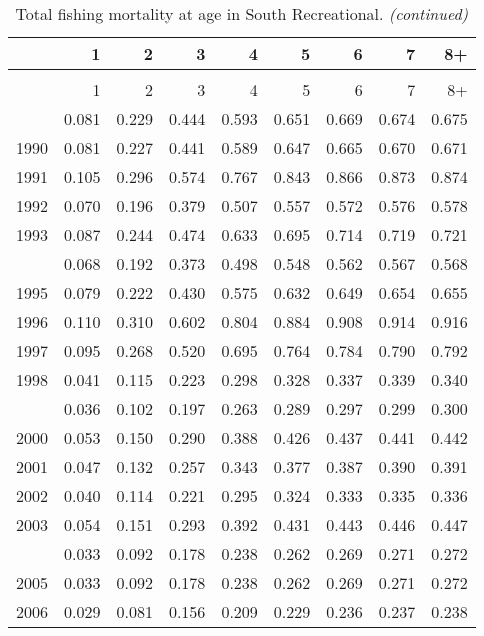 \documentclass[
]{article}
\begin{document}
\begin{longtable}[t]{lrrrrrrrr}
\caption{\label{tab:South_Recreational-fleet-FAA-table}Total fishing mortality at age in South Recreational.}\\
\toprule
  & 1 & 2 & 3 & 4 & 5 & 6 & 7 & 8+\\
\midrule
\endfirsthead
\caption[]{Total fishing mortality at age in South Recreational. \textit{(continued)}}\\
\toprule
  & 1 & 2 & 3 & 4 & 5 & 6 & 7 & 8+\\
\midrule
\endhead

\endfoot
\bottomrule
\endlastfoot
1989 & 0.081 & 0.229 & 0.444 & 0.593 & 0.651 & 0.669 & 0.674 & 0.675\\
1990 & 0.081 & 0.227 & 0.441 & 0.589 & 0.647 & 0.665 & 0.670 & 0.671\\
1991 & 0.105 & 0.296 & 0.574 & 0.767 & 0.843 & 0.866 & 0.873 & 0.874\\
1992 & 0.070 & 0.196 & 0.379 & 0.507 & 0.557 & 0.572 & 0.576 & 0.578\\
1993 & 0.087 & 0.244 & 0.474 & 0.633 & 0.695 & 0.714 & 0.719 & 0.721\\
\addlinespace
1994 & 0.068 & 0.192 & 0.373 & 0.498 & 0.548 & 0.562 & 0.567 & 0.568\\
1995 & 0.079 & 0.222 & 0.430 & 0.575 & 0.632 & 0.649 & 0.654 & 0.655\\
1996 & 0.110 & 0.310 & 0.602 & 0.804 & 0.884 & 0.908 & 0.914 & 0.916\\
1997 & 0.095 & 0.268 & 0.520 & 0.695 & 0.764 & 0.784 & 0.790 & 0.792\\
1998 & 0.041 & 0.115 & 0.223 & 0.298 & 0.328 & 0.337 & 0.339 & 0.340\\
\addlinespace
1999 & 0.036 & 0.102 & 0.197 & 0.263 & 0.289 & 0.297 & 0.299 & 0.300\\
2000 & 0.053 & 0.150 & 0.290 & 0.388 & 0.426 & 0.437 & 0.441 & 0.442\\
2001 & 0.047 & 0.132 & 0.257 & 0.343 & 0.377 & 0.387 & 0.390 & 0.391\\
2002 & 0.040 & 0.114 & 0.221 & 0.295 & 0.324 & 0.333 & 0.335 & 0.336\\
2003 & 0.054 & 0.151 & 0.293 & 0.392 & 0.431 & 0.443 & 0.446 & 0.447\\
\addlinespace
2004 & 0.033 & 0.092 & 0.178 & 0.238 & 0.262 & 0.269 & 0.271 & 0.272\\
2005 & 0.033 & 0.092 & 0.178 & 0.238 & 0.262 & 0.269 & 0.271 & 0.272\\
2006 & 0.029 & 0.081 & 0.156 & 0.209 & 0.229 & 0.236 & 0.237 & 0.238\\

\end{longtable}
\end{document}
